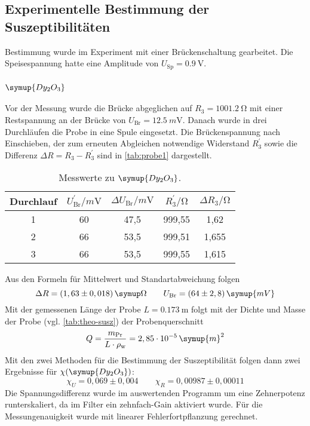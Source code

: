 \subsection{Experimentelle Bestimmung der Suszeptibilitäten}
\label{sec:Experimentelle Bestimmung der Suszeptibilitäten}

Bestimmung wurde im Experiment mit einer Brückenschaltung gearbeitet. Die Speisespannung
hatte eine Amplitude von $U_\text{Sp} = \SI{0.9}{\volt}$.

\subsubsection{$\symup{Dy_2O_3}$}
\label{sec:ausw-Dy2O3}

Vor der Messung wurde die Brücke abgeglichen auf $R_3 = \SI{1001.2}{\ohm}$ mit einer
Restspannung an der Brücke von $U_\text{Br} = \SI{12.5}{m\volt}$. Danach wurde in drei
Durchläufen die Probe in eine Spule eingesetzt. Die Brückenspannung nach Einschieben, der
zum erneuten Abgleichen notwendige Widerstand $R_3^\prime$ sowie die Differenz 
$\Delta R = R_3 - R_3^\prime$ sind in \autoref{tab:probe1} dargestellt.

\begin{table}
  \centering
  \caption{Messwerte zu $\symup{Dy_2O_3}$.}
  \label{tab:probe1}
  \begin{tabular}{c c c c c}
  \toprule
  Durchlauf &
  $U_\text{Br}^\prime / \si{m\volt}$ &
  $\Delta U_\text{Br} / \si{m\volt}$ &
  $R_3^\prime / \si{\ohm} $ &
  $\Delta R_3 / \si{\ohm} $ \\
  \midrule
  1 & 60 & 47,5 & 999,55 & 1,62 \\
  2 & 66 & 53,5 & 999,51 & 1,655 \\
  3 & 66 & 53,5 & 999,55 & 1,615 \\
  \bottomrule
  \end{tabular}
\end{table}
\noindent
Aus den Formeln für Mittelwert und Standartabweichung folgen
\begin{equation}
	\Delta R = (1,63 \pm 0,018) \,\symup\Omega
	\qquad
	U_\text{Br} = (64 \pm 2,8) \,\symup{mV}
\end{equation}
Mit der gemessenen Länge der Probe
$L = \SI{0.173}{\meter}$ folgt mit der Dichte und Masse der Probe 
(vgl. \autoref{tab:theo-susz}) der Probenquerschnitt 
\[
	Q =  \frac{m_\text{Pr}}{L \cdot \rho_\text{w}}
	= 2,85 \cdot 10^{-5} \,\symup{m}^2
\]
Mit den zwei Methoden für die Bestimmung der Suszeptibilität folgen dann zwei Ergebnisse
für $\chi(\symup{Dy_2O_3})$:
\begin{equation}
	\chi_U = 0,069 \pm 0,004
	\qquad
	\chi_R = 0,00987 \pm 0,00011
\end{equation}
Die Spannungsdifferenz wurde im auswertenden Programm um eine Zehnerpotenz runterskaliert, da
im Filter ein zehnfach-Gain aktiviert wurde. Für die Messungenauigkeit wurde 
mit linearer Fehlerfortpflanzung gerechnet.

